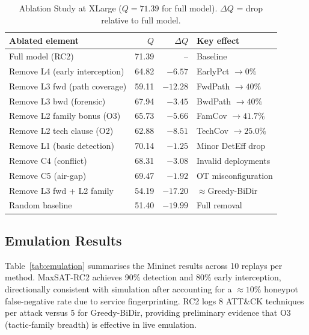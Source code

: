 \documentclass[journal]{IEEEtran}
\begin{document}
\begin{table}[t]
\caption{Ablation Study at XLarge ($Q=71.39$ for full model).
  $\Delta Q$ = drop relative to full model.}
\label{tab:ablation}
\centering
\renewcommand{\arraystretch}{1.2}
\begin{tabular}{lrrl}
\toprule
Ablated element & $Q$ & $\Delta Q$ & Key effect \\
\midrule
Full model (RC2)               & 71.39 &   --   & Baseline \\
Remove L4 (early interception) & 64.82 & $-6.57$  & EarlyPct $\to 0\%$ \\
Remove L3 fwd (path coverage)  & 59.11 & $-12.28$ & FwdPath $\to 40\%$ \\
Remove L3 bwd (forensic)       & 67.94 & $-3.45$  & BwdPath $\to 40\%$ \\
Remove L2 family bonus (O3)    & 65.73 & $-5.66$  & FamCov $\to 41.7\%$ \\
Remove L2 tech clause (O2)     & 62.88 & $-8.51$  & TechCov $\to 25.0\%$ \\
Remove L1 (basic detection)    & 70.14 & $-1.25$  & Minor DetEff drop \\
Remove C4 (conflict)           & 68.31 & $-3.08$  & Invalid deployments \\
Remove C5 (air-gap)            & 69.47 & $-1.92$  & OT misconfiguration \\
Remove L3 fwd + L2 family      & 54.19 & $-17.20$ & $\approx$Greedy-BiDir \\
Random baseline                & 51.40 & $-19.99$ & Full removal \\
\bottomrule
\end{tabular}
\end{table}

\subsection{Emulation Results}
\label{sec:results:emulation}

Table~\ref{tab:emulation} summarises the Mininet results across 10
replays per method. MaxSAT-RC2 achieves 90\% detection and 80\% early
interception, directionally consistent with simulation after accounting
for a ${\approx}10\%$ honeypot false-negative rate due to service
fingerprinting. RC2 logs 8 ATT\&CK techniques per attack versus 5 for
Greedy-BiDir, providing preliminary evidence that O3 (tactic-family
breadth) is effective in live emulation.
\end{document}
